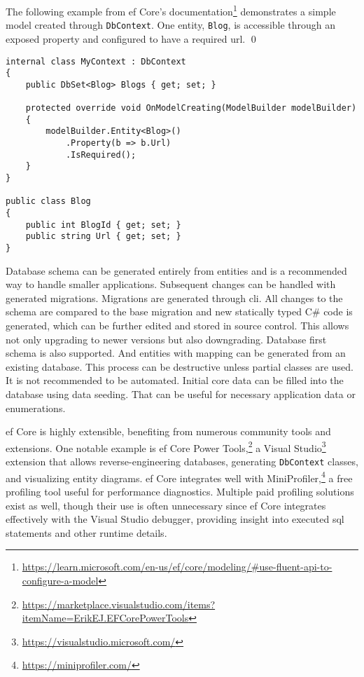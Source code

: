 \begin{example}
\small
The following example from \acrshort{ef} Core's documentation\footnote{\url{https://learn.microsoft.com/en-us/ef/core/modeling/\#use-fluent-api-to-configure-a-model}} demonstrates a simple model created through \texttt{DbContext}. One entity, \texttt{Blog}, is accessible through an exposed property and configured to have a required \acrshort{url}.
\qed

\begin{lstlisting}[language=CSharp]
internal class MyContext : DbContext
{
    public DbSet<Blog> Blogs { get; set; }

    protected override void OnModelCreating(ModelBuilder modelBuilder)
    {
        modelBuilder.Entity<Blog>()
            .Property(b => b.Url)
            .IsRequired();
    }
}

public class Blog
{
    public int BlogId { get; set; }
    public string Url { get; set; }
}
\end{lstlisting}
\end{example}

Database schema can be generated entirely from entities and is a recommended way to handle smaller applications. Subsequent changes can be handled with generated migrations. Migrations are generated through \acrshort{cli}. All changes to the schema are compared to the base migration and new statically typed C\# code is generated, which can be further edited and stored in source control. This allows not only upgrading to newer versions but also downgrading. Database first schema is also supported. And entities with mapping can be generated from an existing database. This process can be destructive unless partial classes are used. It is not recommended to be automated. Initial core data can be filled into the database using data seeding. That can be useful for necessary application data or enumerations.

\acrshort{ef} Core is highly extensible, benefiting from numerous community tools and extensions. One notable example is \acrshort{ef} Core Power Tools,\footnote{\url{https://marketplace.visualstudio.com/items?itemName=ErikEJ.EFCorePowerTools}} a Visual Studio\footnote{\url{https://visualstudio.microsoft.com/}} extension that allows reverse-engineering databases, generating \texttt{DbContext} classes, and visualizing entity diagrams. \acrshort{ef} Core integrates well with MiniProfiler,\footnote{\url{https://miniprofiler.com/}} a free profiling tool useful for performance diagnostics. Multiple paid profiling solutions exist as well, though their use is often unnecessary since \acrshort{ef} Core integrates effectively with the Visual Studio debugger, providing insight into executed \acrshort{sql} statements and other runtime details.


